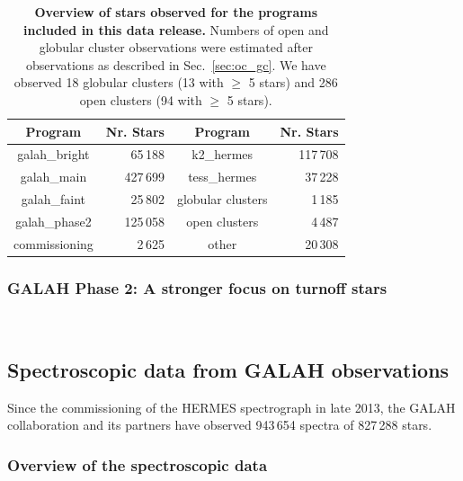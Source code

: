 \documentclass[
  journal=pasa,
  manuscript=research-paper, %
  year=2023,
  volume=37
]{cup-journal}
\begin{document}
\begin{table}
\centering
 \caption{\textbf{Overview of stars observed for the programs included in this data release.} Numbers of open and globular cluster observations were estimated after observations as described in Sec.~\ref{sec:oc_gc}. We have observed 18 globular clusters (13 with $\geq$ 5 stars) and 286 open clusters (94 with $\geq$ 5 stars).}
\label{tab:field_ids}
\begin{tabular}{crcr}
\hline \hline
Program & Nr. Stars & Program & Nr. Stars \\
\hline
galah\_bright & 65\,188 & 
k2\_hermes & 117\,708\\
galah\_main & 427\,699 & 
tess\_hermes & 37\,228\\
galah\_faint & 25\,802 & 
globular clusters & 1\,185\\
galah\_phase2 & 125\,058 & 
open clusters & 4\,487\\
commissioning & 2\,625 & 
other & 20\,308\\
  \hline
 \end{tabular}
\end{table}

\subsubsection{GALAH Phase 2: A stronger focus on turnoff stars} $\,$


\subsection{Spectroscopic data from GALAH observations}
\label{sec:spectroscopic_data_from_galah_observations}

Since the commissioning of the HERMES spectrograph in late 2013, the GALAH collaboration and its partners have observed 943\,654 spectra of 827\,288 stars.

\subsubsection{Overview of the spectroscopic data} \label{sec:overview_spectroscopic_data}

\end{document}
